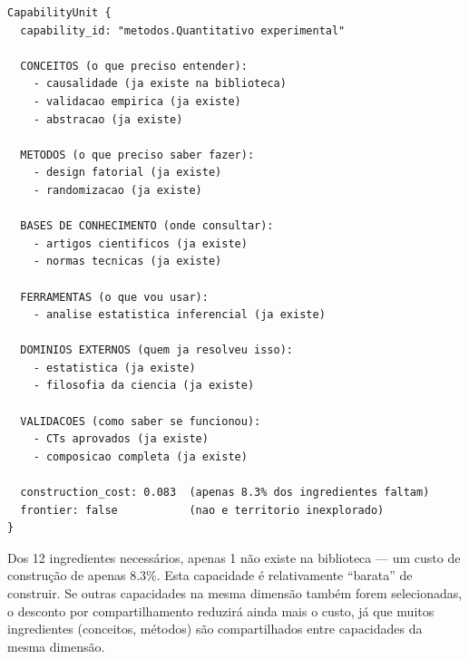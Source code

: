 \begin{verbatim}
CapabilityUnit {
  capability_id: "metodos.Quantitativo experimental"
  
  CONCEITOS (o que preciso entender):
    - causalidade (ja existe na biblioteca)
    - validacao empirica (ja existe)
    - abstracao (ja existe)
  
  METODOS (o que preciso saber fazer):
    - design fatorial (ja existe)
    - randomizacao (ja existe)
  
  BASES DE CONHECIMENTO (onde consultar):
    - artigos cientificos (ja existe)
    - normas tecnicas (ja existe)
  
  FERRAMENTAS (o que vou usar):
    - analise estatistica inferencial (ja existe)
  
  DOMINIOS EXTERNOS (quem ja resolveu isso):
    - estatistica (ja existe)
    - filosofia da ciencia (ja existe)
  
  VALIDACOES (como saber se funcionou):
    - CTs aprovados (ja existe)
    - composicao completa (ja existe)
  
  construction_cost: 0.083  (apenas 8.3% dos ingredientes faltam)
  frontier: false           (nao e territorio inexplorado)
}
\end{verbatim}

Dos 12 ingredientes necessários, apenas 1 não existe na biblioteca — um custo de construção de apenas 8.3\%. Esta capacidade é relativamente ``barata'' de construir. Se outras capacidades na mesma dimensão também forem selecionadas, o desconto por compartilhamento reduzirá ainda mais o custo, já que muitos ingredientes (conceitos, métodos) são compartilhados entre capacidades da mesma dimensão.
